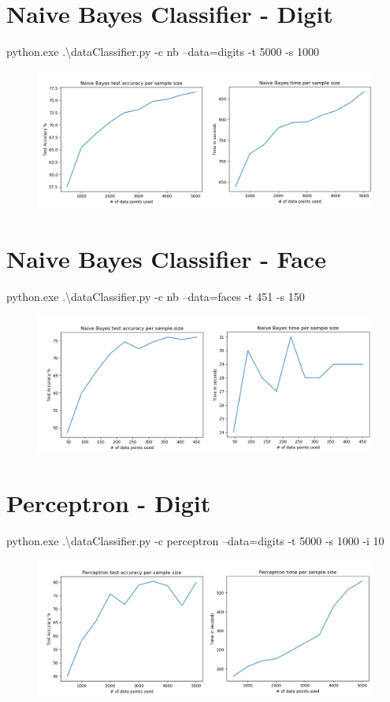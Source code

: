\documentclass[12pt]{article}
\begin{document}
\section*{Naive Bayes Classifier - Digit}
python.exe .\textbackslash dataClassifier.py -c nb --data=digits -t 5000 -s 1000 \\
\begin{figure}[!htb]
	\centering
	\includegraphics[width=1\textwidth]{nb_d.png}
\end{figure}
\section*{Naive Bayes Classifier - Face}
python.exe .\textbackslash dataClassifier.py -c nb --data=faces -t 451 -s 150 \\
\begin{figure}[!htb]
	\centering
	\includegraphics[width=1\textwidth]{nb_f.png}
\end{figure}
\newpage
\section*{Perceptron - Digit}
python.exe .\textbackslash dataClassifier.py -c perceptron --data=digits -t 5000 -s 1000 -i 10 \\
\begin{figure}[!htb]
	\centering
	\includegraphics[width=1\textwidth]{perc_d.png}
\end{figure}
\end{document}
